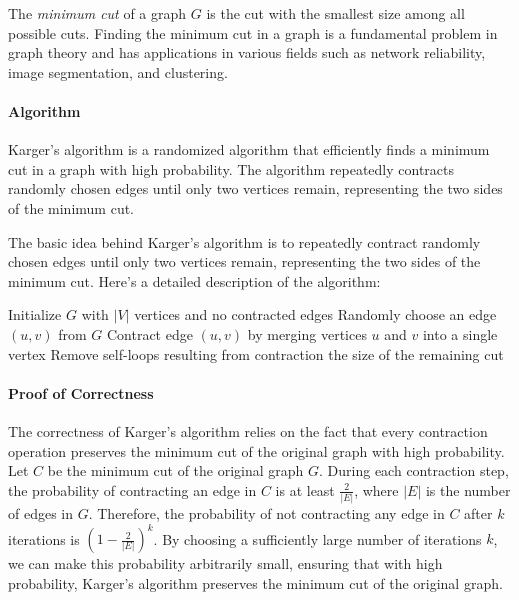 \documentclass[12pt]{book} %
\begin{document}
The \textit{minimum cut} of a graph \(G\) is the cut with the smallest size among all possible cuts. Finding the minimum cut in a graph is a fundamental problem in graph theory and has applications in various fields such as network reliability, image segmentation, and clustering.

\paragraph{Algorithm}
Karger's algorithm is a randomized algorithm that efficiently finds a minimum cut in a graph with high probability. The algorithm repeatedly contracts randomly chosen edges until only two vertices remain, representing the two sides of the minimum cut. 

The basic idea behind Karger's algorithm is to repeatedly contract randomly chosen edges until only two vertices remain, representing the two sides of the minimum cut. Here's a detailed description of the algorithm:
\FloatBarrier
\begin{algorithm}[H]
\caption{Karger's Algorithm for Minimum Cut}
\begin{algorithmic}[1]
    \State Initialize \(G\) with \(|V|\) vertices and no contracted edges
        \State Randomly choose an edge \((u, v)\) from \(G\)
        \State Contract edge \((u, v)\) by merging vertices \(u\) and \(v\) into a single vertex
        \State Remove self-loops resulting from contraction
    \EndWhile
    \State \Return the size of the remaining cut
\EndProcedure
\end{algorithmic}
\end{algorithm}
\FloatBarrier
\paragraph{Proof of Correctness}
The correctness of Karger's algorithm relies on the fact that every contraction operation preserves the minimum cut of the original graph with high probability. Let \(C\) be the minimum cut of the original graph \(G\). During each contraction step, the probability of contracting an edge in \(C\) is at least \(\frac{2}{|E|}\), where \(|E|\) is the number of edges in \(G\). Therefore, the probability of not contracting any edge in \(C\) after \(k\) iterations is \((1 - \frac{2}{|E|})^k\). By choosing a sufficiently large number of iterations \(k\), we can make this probability arbitrarily small, ensuring that with high probability, Karger's algorithm preserves the minimum cut of the original graph.
\end{document}
